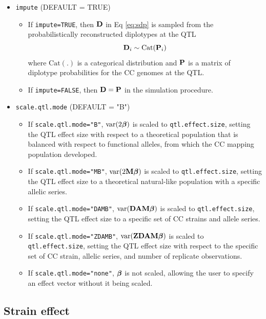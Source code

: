 \begin{itemize}
    \item \texttt{impute} (DEFAULT = TRUE)
    \begin{itemize}
    	\item If \texttt{impute=TRUE}, then $\mathbf{D}$ in Eq \ref{eq:sdp} is sampled from the probabilistically reconstructed diplotypes at the QTL
        \begin{equation}
        	\mathbf{D}_{i} \sim \text{Cat}(\mathbf{P}_{i})
        \end{equation}
        where $\text{Cat}(.)$ is a categorical distribution and $\mathbf{P}$ is a matrix of diplotype probabilities for the CC genomes at the QTL.
        \item If \texttt{impute=FALSE}, then $\mathbf{D} = \mathbf{P}$ in the simulation procedure.
    \end{itemize}
    \item \texttt{scale.qtl.mode} (DEFAULT = "B")
    \begin{itemize}
    	\item If \texttt{scale.qtl.mode="B"}, $\text{var}(2\boldsymbol{\beta})$ is scaled to \texttt{qtl.effect.size}, setting the QTL effect size with respect to a theoretical population that is balanced with respect to functional alleles, from which the CC mapping population developed. 
        \item If \texttt{scale.qtl.mode="MB"}, $\text{var}(2\mathbf{M}\boldsymbol{\beta})$ is scaled to \texttt{qtl.effect.size}, setting the QTL effect size to a theoretical natural-like population with a specific allelic series.
	\item If \texttt{scale.qtl.mode="DAMB"}, $\text{var}(\mathbf{D}\mathbf{A}\mathbf{M}\boldsymbol{\beta})$ is scaled to \texttt{qtl.effect.size}, setting the QTL effect size to a specific set of CC strains and allele series.
    \item If \texttt{scale.qtl.mode="ZDAMB"}, $\text{var}(\mathbf{Z}\mathbf{D}\mathbf{A}\mathbf{M}\boldsymbol{\beta})$ is scaled to \texttt{qtl.effect.size}, setting the QTL effect size with respect to the specific set of CC strain, allelic series, and number of replicate observations.
    \item If \texttt{scale.qtl.mode="none"}, $\boldsymbol{\beta}$ is not scaled, allowing the user to specify an effect vector without it being scaled.
    \end{itemize}
\end{itemize}

\subsection{Strain effect}

